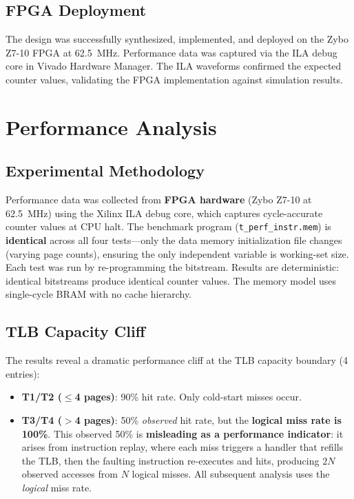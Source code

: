 \documentclass[conference]{IEEEtran}
\begin{document}
\subsection{FPGA Deployment}

The design was successfully synthesized, implemented, and deployed on the Zybo Z7-10 FPGA at 62.5~MHz. Performance data was captured via the ILA debug core in Vivado Hardware Manager. The ILA waveforms confirmed the expected counter values, validating the FPGA implementation against simulation results.
\section{Performance Analysis}

\subsection{Experimental Methodology}

Performance data was collected from \textbf{FPGA hardware} (Zybo Z7-10 at 62.5~MHz) using the Xilinx ILA debug core, which captures cycle-accurate counter values at CPU halt. The benchmark program (\texttt{t\_perf\_instr.mem}) is \textbf{identical} across all four tests---only the data memory initialization file changes (varying page counts), ensuring the only independent variable is working-set size. Each test was run by re-programming the bitstream. Results are deterministic: identical bitstreams produce identical counter values. The memory model uses single-cycle BRAM with no cache hierarchy.

\subsection{TLB Capacity Cliff}

The results reveal a dramatic performance cliff at the TLB capacity boundary (4 entries):

\begin{itemize}
    \item \textbf{T1/T2 ($\leq$4 pages)}: 90\% hit rate. Only cold-start misses occur.
    \item \textbf{T3/T4 ($>$4 pages)}: 50\% \textit{observed} hit rate, but the \textbf{logical miss rate is 100\%}. This observed 50\% is \textbf{misleading as a performance indicator}: it arises from instruction replay, where each miss triggers a handler that refills the TLB, then the faulting instruction re-executes and hits, producing $2N$ observed accesses from $N$ logical misses. All subsequent analysis uses the \textit{logical} miss rate.
\end{itemize}
\end{document}
